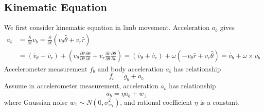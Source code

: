 \documentclass[12pt]{article}
\begin{document}
    \subsection{Kinematic Equation}
    We first consider kinematic equation in limb movement. Acceleration $a_b$ gives
    \begin{equation}
    \begin{aligned}
        a_b &= \frac{\partial}{\partial t}{v_b} = \frac{\partial}{\partial t}(v_\theta \hat \theta + v_r \hat r) \\
        &= (\dot{v_\theta} + \dot{v_r}) + (v_\theta \frac{\partial \hat \theta}{\partial \theta}\frac{\partial \theta}{\partial t} + v_r \frac{\partial \hat r}{\partial \theta}\frac{\partial \theta}{\partial t}) = (\dot{v_\theta} + \dot{v_r}) + \omega(-v_\theta \hat r + v_r \hat \theta) = \dot{v_b} + \omega \times v_b
    \end{aligned}
    \end{equation}
    Accelerometer measurement $f_b$ and body acceleration $a_b$ has relationship
    \begin{equation}
        f_b = g_b + a_b
    \end{equation}
    Assume in accelerometer measurement, acceleration $a_b$ has relationship
    \begin{equation}
        \dot{a_b} = \eta a_b + w_1
    \end{equation}
    where Gaussian noise $w_1 \sim N(0, \sigma_{w_1}^2)$, and rational coefficient $\eta$ is a constant.
\end{document}
